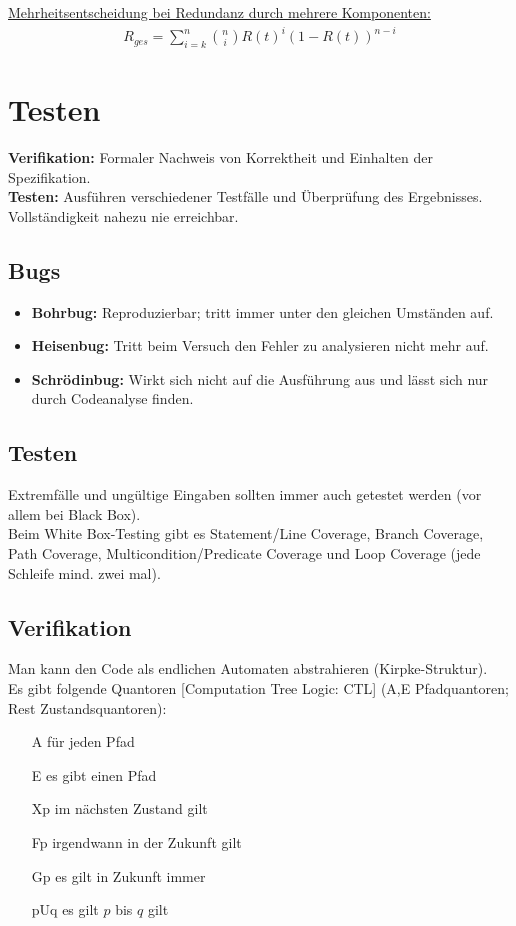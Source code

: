 \documentclass[a4paper, 11pt, accentcolor = tud3b]{tudreport}
\begin{document}
				\underline{Mehrheitsentscheidung bei Redundanz durch mehrere Komponenten:}
				\begin{align*}
					R_{ges}=\sum\limits_{i=k}^n\binom{n}{i}R(t)^i(1-R(t))^{n-i}
				\end{align*}
				
		\chapter{Testen}
			\textbf{Verifikation:} Formaler Nachweis von Korrektheit und Einhalten der Spezifikation.\\
			\textbf{Testen:} Ausführen verschiedener Testfälle und Überprüfung des Ergebnisses. Vollständigkeit nahezu nie erreichbar.
			
			\section{Bugs}
				\begin{itemize}
					\item \textbf{Bohrbug:} Reproduzierbar; tritt immer unter den gleichen Umständen auf.
					\item \textbf{Heisenbug:} Tritt beim Versuch den Fehler zu analysieren nicht mehr auf.
					\item \textbf{Schrödinbug:} Wirkt sich nicht auf die Ausführung aus und lässt sich nur durch Codeanalyse finden.
				\end{itemize}
				
			\section{Testen}
				Extremfälle und ungültige Eingaben sollten immer auch getestet werden (vor allem bei Black Box).\\Beim White Box-Testing gibt es Statement/Line Coverage, Branch Coverage, Path Coverage, Multicondition/Predicate Coverage und Loop Coverage (jede Schleife mind. zwei mal).
			
			\section{Verifikation}
			Man kann den Code als endlichen Automaten abstrahieren (Kirpke-Struktur).\\
			Es gibt folgende Quantoren [Computation Tree Logic: CTL] (A,E Pfadquantoren; Rest Zustandsquantoren):
			\begin{itemize}
				\item[A] für jeden Pfad
				\item[E] es gibt einen Pfad
				\item[Xp] im nächsten Zustand gilt
				\item[Fp] irgendwann in der Zukunft gilt
				\item[Gp] es gilt in Zukunft immer
				\item[pUq] es gilt $p$ bis $q$ gilt
			\end{itemize}
	
\end{document}
